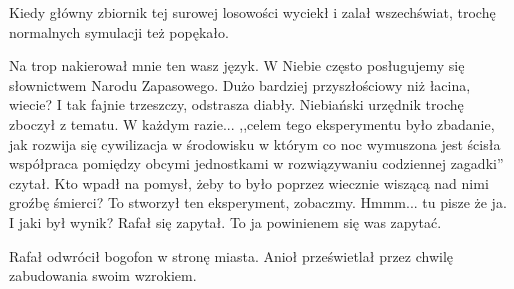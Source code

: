 Kiedy główny zbiornik tej surowej losowości wyciekł i zalał wszechświat, trochę normalnych symulacji też popękało.
\begin{dialogue}
	\ds{} Na trop nakierował mnie ten wasz język. W Niebie często posługujemy się słownictwem Narodu Zapasowego. Dużo bardziej przyszłościowy niż łacina, wiecie? I tak fajnie trzeszczy, odstrasza diabły.
		\dm{} Niebiański urzędnik trochę zboczył z tematu.
		\dm{} W każdym razie... ,,celem tego eksperymentu było zbadanie, jak rozwija się cywilizacja w środowisku w którym co noc wymuszona jest ścisła współpraca pomiędzy obcymi jednostkami w rozwiązywaniu codziennej zagadki''
		\dm{} czytał.
		\dm{} Kto wpadł na pomysł, żeby to było poprzez wiecznie wiszącą nad nimi groźbę śmierci? To stworzył ten eksperyment, zobaczmy. Hmmm... tu pisze że ja.
	\ds{} I jaki był wynik? 
		\dm{} Rafał się zapytał.
	\ds{} To ja powinienem się was zapytać.
\end{dialogue}
Rafał odwrócił bogofon w stronę miasta. Anioł prześwietlał przez chwilę zabudowania swoim wzrokiem.
